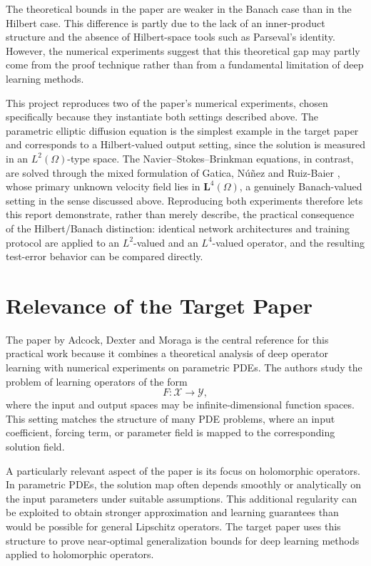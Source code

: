 The theoretical bounds in the paper are weaker in the Banach case than in the Hilbert case. This difference is partly due to the lack of an inner-product structure and the absence of Hilbert-space tools such as Parseval's identity.
However, the numerical experiments suggest that this theoretical gap may partly come from the proof technique rather than from a fundamental limitation of deep learning methods.

This project reproduces two of the paper's numerical experiments, chosen
specifically because they instantiate both settings described above. The
parametric elliptic diffusion equation is the simplest example in the target
paper and corresponds to a Hilbert-valued output setting, since the solution
is measured in an $L^2(\Omega)$-type space. The Navier--Stokes--Brinkman
equations, in contrast, are solved through the mixed formulation of
Gatica, N\'{u}\~{n}ez and Ruiz-Baier \cite{gatica2022nsb}, whose primary
unknown velocity field lies in $\mathbf{L}^4(\Omega)$, a genuinely
Banach-valued setting in the sense discussed above. Reproducing both experiments therefore lets this
report demonstrate, rather than merely describe, the practical consequence
of the Hilbert/Banach distinction: identical network architectures and
training protocol are applied to an $L^2$-valued and an $L^4$-valued
operator, and the resulting test-error behavior can be compared directly.

\section{Relevance of the Target Paper}

The paper by Adcock, Dexter and Moraga \cite{adcock2024holomorphic} is the
central reference for this practical work because it combines a theoretical analysis of deep operator learning with numerical experiments on parametric PDEs.
The authors study the problem of learning operators of the form
\[
    F : \mathcal{X} \to \mathcal{Y},
\]
where the input and output spaces may be infinite-dimensional function spaces. This setting matches the structure of many PDE problems, where an input coefficient, forcing term, or parameter field is mapped to the corresponding solution field.

A particularly relevant aspect of the paper is its focus on holomorphic
operators. In parametric PDEs, the solution map often depends smoothly or
analytically on the input parameters under suitable assumptions. This additional regularity can be exploited to obtain stronger approximation and learning guarantees than would be possible for general Lipschitz operators. The target paper uses this structure to prove near-optimal generalization bounds for deep learning methods applied to holomorphic operators.

